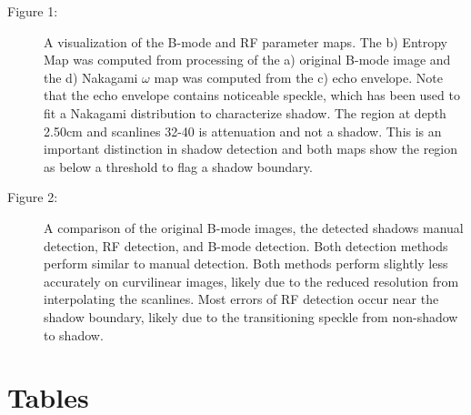 \documentclass[authoryear,preprint,review,12pt]{elsarticle}
\begin{document}
\begin{description}
\item[Figure 1:]  A visualization of the B-mode and RF parameter maps. The b) Entropy Map was computed from processing of the a) original B-mode image and the d) Nakagami $\omega$ map was computed from the c) echo envelope. Note that the echo envelope contains noticeable speckle, which has been used to fit a Nakagami distribution to characterize shadow. The region at depth 2.50cm and scanlines 32-40 is attenuation and not a shadow. This is an important distinction in shadow detection and both maps show the region as below a threshold to flag a shadow boundary.
\item[Figure 2:]  A comparison of the original B-mode images, the detected shadows manual detection, RF detection, and B-mode detection. Both detection methods perform similar to manual detection. Both methods perform slightly less accurately on curvilinear images, likely due to the reduced resolution from interpolating the scanlines. Most errors of RF detection occur near the shadow boundary, likely due to the transitioning speckle from non-shadow to shadow.
\end{description}






\pagebreak

\section*{Tables}
\end{document}
